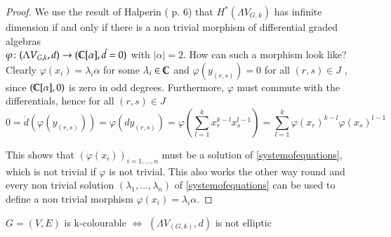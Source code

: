 \begin{proof}
 We use the result of Halperin (\cite{Halperin1988} p. 6) that $H^*(\Lambda V_{G,k})$ has infinite dimension if and only if %
 there is a non trivial morphism of differential graded algebras \\
 ${\varphi \colon (\Lambda V_{G,k},d) \to ( \mathbb{C} [\alpha] ,\acute{d} = 0)}$ with $|\alpha| = 2$. How can such a morphism look like?
 Clearly $\varphi(x_i) = \lambda_i \alpha$ for some $\lambda_i \in \mathbb{C}$ and $\varphi(y_{(r,s)}) = 0$ for all $(r,s) \in J$ , since 
 $(\mathbb{C} [\alpha] , 0)$ is zero in odd degrees. Furthermore, $\varphi$ must commute with the differentials, hence 
 for all $(r,s) \in J$
 $$ 0 = \acute{d} (\varphi(y_{(r,s)})) = \varphi(dy_{(r,s)}) = \varphi(\sum_{l = 1}^k x_r^{k -l} x_s^{l - 1})
 = \sum_{l = 1}^k \varphi(x_r)^{k -l} \varphi(x_s)^{l - 1}$$
 
 This shows that $(\varphi(x_i))_{i = 1, \dotsc , n}$ must be a solution of \ref{systemofequations}, which is not trivial
 if $\varphi$ is not trivial.
 This also works the other way round and every non trivial solution  $(\lambda_1 , \dotsc, \lambda_n)$ of \ref{systemofequations}
 can be used to define a non trivial morphism $\varphi(x_i) = \lambda_i \alpha$.
 \end{proof}

 \begin{Theorem}
   $G = (V,E)$ is k-colourable $\iff$ $(\Lambda V_{(G,k)},d)$ is not elliptic
 \end{Theorem}

